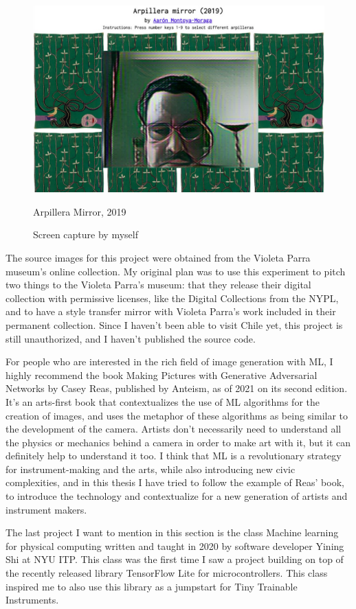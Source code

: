 \begin{figure}[ht]
  \centering
    \includegraphics[width=0.75\linewidth,height=0.35\textheight,keepaspectratio]{images/arpillera-mirror.jpg}
  \caption{Arpillera Mirror, 2019}
  \caption*{Screen capture by myself}
  \label{fig:arpillera-mirror}
\end{figure}

 The source images for this project were obtained from the Violeta Parra museum's online collection. My original plan was to use this experiment to pitch two things to the Violeta Parra's museum: that they release their digital collection with permissive licenses, like the Digital Collections from the \acrfull{NYPL}, and to have a style transfer mirror with Violeta Parra's work included in their permanent collection. Since I haven't been able to visit Chile yet, this project is still unauthorized, and I haven't published the source code.

For people who are interested in the rich field of image generation with \acrshort{ML}, I highly recommend the book Making Pictures with Generative Adversarial Networks \cite{making-pictures-with-gans} by Casey Reas, published by Anteism, as of 2021 on its second edition. It’s an arts-first book that contextualizes the use of \acrshort{ML} algorithms for the creation of images, and uses the metaphor of these algorithms as being similar to the development of the camera. Artists don’t necessarily need to understand all the physics or mechanics behind a camera in order to make art with it, but it can definitely help to understand it too. I think that \acrshort{ML} is a revolutionary strategy for instrument-making and the arts, while also introducing new civic complexities, and in this thesis I have tried to follow the example of Reas' book, to introduce the technology and contextualize for a new generation of artists and instrument makers.

The last project I want to mention in this section is the class Machine learning for physical computing \cite{repository-yining1023-machine-learning-for-physical-computing} written and taught in 2020 by software developer Yining Shi \cite{website-yining-shi} at \acrshort{NYU} \acrshort{ITP}. This class was the first time I saw a project building on top of the recently released library TensorFlow Lite for microcontrollers. This class inspired me to also use this library as a jumpstart for Tiny Trainable Instruments.
